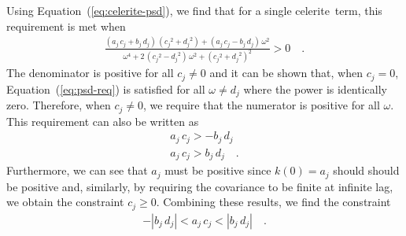 \documentclass[manuscript, letterpaper]{aastex6}
\newcommand{\project}[1]{\textsf{#1}}
\newcommand{\celerite}{\project{celerite}}
\renewcommand{\eqref}[1]{\ref{eq:#1}}
\newcommand{\Eq}[1]{Equation~(\eqref{#1})}
\newcommand{\eq}[1]{\Eq{#1}}
\newcommand{\eqlabel}[1]{\label{eq:#1}}
\begin{document}
Using \eq{celerite-psd}, we find that for a single \celerite\ term, this
requirement is met when
\begin{eqnarray}\eqlabel{psd-req}
\frac{(a_j\,c_j+b_j\,d_j)\,({c_j}^2+{d_j}^2)+(a_j\,c_j-b_j\,d_j)\,\omega^2}
{\omega^4+2\,({c_j}^2-{d_j}^2)\,\omega^2+{({c_j}^2+{d_j}^2)}^2} > 0 \quad.
\end{eqnarray}
The denominator is positive for all $c_j \ne 0$ and it can be shown that, when
$c_j=0$, \eq{psd-req} is satisfied for all $\omega \ne d_j$ where the power is
identically zero.
Therefore, when $c_j \ne 0$, we require that the numerator is positive for all
$\omega$.
This requirement can also be written as
\begin{eqnarray}
a_j\,c_j > -b_j\,d_j \\
a_j\,c_j > b_j\,d_j \quad.
\end{eqnarray}
Furthermore, we can see that $a_j$ must be positive since $k(0) = a_j$ should
should be positive and, similarly, by requiring the covariance to be finite at
infinite lag, we obtain the constraint $c_j \ge 0$.
Combining these results, we find the constraint
\begin{eqnarray}
    -|b_j\,d_j| < a_j\,c_j < |b_j\,d_j| \quad.
\end{eqnarray}

\end{document}
